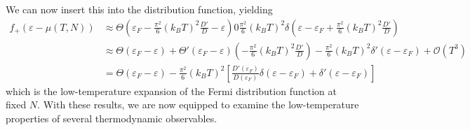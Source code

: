 We can now insert this into the distribution function, yielding
\begin{align*}
	f_+(\varepsilon-\mu(T,N))&\approx\Theta\left(\varepsilon_F - \frac{\pi^2}{6}(k_BT)^2\frac{D'}{D}-\varepsilon\right) 0 \frac{\pi^2}{6}(k_BT)^2\delta\left(\varepsilon-\varepsilon_F + \frac{\pi^2}{6}(k_BT)^2\frac{D'}{D}\right)\\
				 &\approx \Theta(\varepsilon_F-\varepsilon)+\Theta'(\varepsilon_F-\varepsilon)\left(-\frac{\pi^2}{6}(k_BT)^2\frac{D'}{D}\right)-\frac{\pi^2}{6}(k_BT)^2\delta'(\varepsilon-\varepsilon_F) +\mathscr{O}(T^3)\\
				 &=\Theta (\varepsilon_F-\varepsilon) - \frac{\pi^2}{6}(k_BT)^2\left[\frac{D'(\varepsilon_F)}{D(\varepsilon_F)}\delta(\varepsilon-\varepsilon_F)+\delta'(\varepsilon-\varepsilon_F)\right]
\end{align*}
which is the low-temperature expansion of the Fermi distribution function at fixed \(N\). With these results, we are now equipped to examine the low-temperature properties of several thermodynamic observables.

